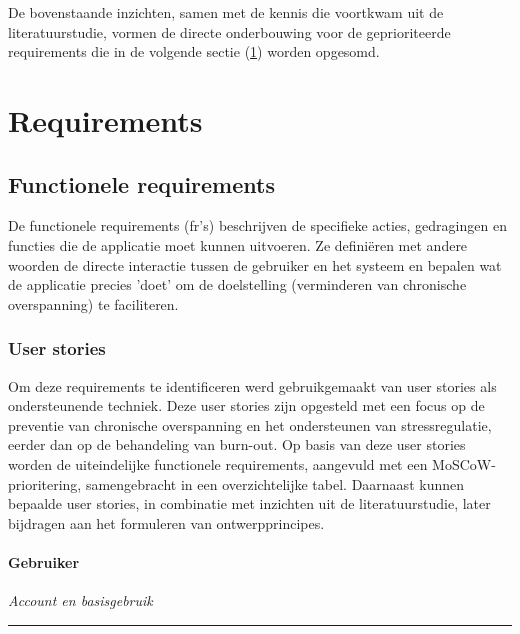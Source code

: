 De bovenstaande inzichten, samen met de kennis die voortkwam uit de literatuurstudie, vormen de directe onderbouwing voor de geprioriteerde requirements die in de volgende sectie (\ref{sec:requirements}) worden opgesomd.

\section{Requirements}
\label{sec:requirements}

\subsection{Functionele requirements}
\label{subsec:frs}

\vspace{1em}

De functionele requirements (\acrshort{fr}'s) beschrijven de specifieke acties, gedragingen en functies die de applicatie moet kunnen uitvoeren. Ze definiëren met andere woorden de directe interactie tussen de gebruiker en het systeem en bepalen wat de applicatie precies 'doet' om de doelstelling (verminderen van chronische overspanning) te faciliteren.

\subsubsection{User stories}
\label{subsubsec:user-stories}

\vspace{1em}

Om deze requirements te identificeren werd gebruikgemaakt van user stories als ondersteunende techniek. Deze user stories zijn opgesteld met een focus op de preventie van chronische overspanning en het ondersteunen van stressregulatie, eerder dan op de behandeling van burn-out. Op basis van deze user stories worden de uiteindelijke functionele requirements, aangevuld met een MoSCoW-prioritering, samengebracht in een overzichtelijke tabel. Daarnaast kunnen bepaalde user stories, in combinatie met inzichten uit de literatuurstudie, later bijdragen aan het formuleren van ontwerpprincipes.

\paragraph{Gebruiker}

\vspace{1em}

\textit{Account en basisgebruik}
\hrule
\vspace{1em}

